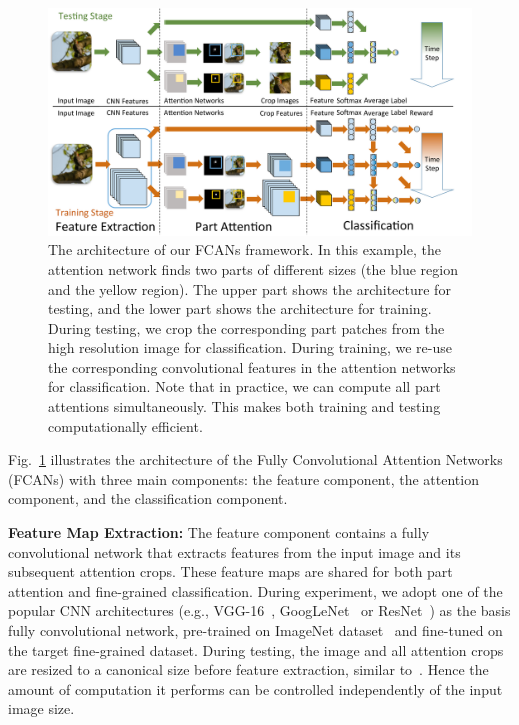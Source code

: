 \documentclass[10pt,twocolumn,letterpaper]{article}
\begin{document}
\begin{figure}[t]
\begin{center}
\includegraphics[width=\linewidth]{figs/1-cropped.pdf}
\end{center}
\caption{The architecture of our FCANs framework.
In this example, the attention network finds two parts of different sizes (the blue region and the yellow region).
The upper part shows the architecture for testing, and the lower part shows the architecture for training.
During testing, we crop the corresponding part patches from the high resolution image for classification.
During training, we re-use the corresponding convolutional features in the attention networks for classification.
Note that in practice, we can compute all part attentions simultaneously.
This makes both training and testing computationally efficient.
}
\label{fig:architecture}
\vspace{-8pt}
\end{figure}

Fig.~\ref{fig:architecture} illustrates the architecture of the Fully Convolutional Attention Networks (FCANs) with three main components: the feature component, the attention component, and the classification component.

\textbf{Feature Map Extraction:}
The feature component contains a fully convolutional network that extracts features from the input image and its subsequent attention crops.
These feature maps are shared for both part attention and fine-grained classification.
During experiment, we adopt one of the popular CNN architectures (e.g., VGG-16~\cite{bd8}, GoogLeNet~\cite{bd7} or ResNet~\cite{he2015deep}) as the basis fully convolutional network, pre-trained on ImageNet dataset~\cite{bd19} and fine-tuned on the target fine-grained dataset.
During testing, the image and all attention crops are resized to a canonical size before feature extraction, similar to~\cite{bd1}.
Hence the amount of computation it performs can be controlled independently of the input image size.
\end{document}
